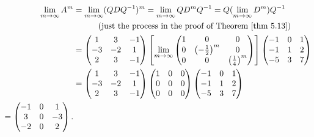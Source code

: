 \begin{align*}
    \lim_{m \toINF} A^m & = \lim_{m \toINF} (Q D Q^{-1})^m = \lim_{m \toINF} Q D^m Q^{-1} = Q (\lim_{m \toINF} D^m) Q^{-1} \\
        & \quad \quad \quad \text{(just the process in the proof of \THM{5.13})} \\
        & = \begin{pmatrix}
                1 & 3 & -1 \\
                -3 & -2 & 1 \\
                2 & 3 & -1
            \end{pmatrix}
            \left[
                \lim_{m \toINF}
                \begin{pmatrix}
                    1 & 0 & 0 \\
                    0 & \left( -\frac{1}{2} \right)^m & 0 \\
                    0 & 0 & \left( \frac{1}{4} \right)^m
                \end{pmatrix}
            \right]
            \begin{pmatrix}
                -1 & 0 & 1 \\
                -1 & 1 & 2 \\
                -5 & 3 & 7
            \end{pmatrix} \\
        & = \begin{pmatrix}
                1 & 3 & -1 \\
                -3 & -2 & 1 \\
                2 & 3 & -1
            \end{pmatrix}
            \begin{pmatrix}
                1 & 0 & 0 \\
                0 & 0 & 0 \\
                0 & 0 & 0
            \end{pmatrix}
            \begin{pmatrix}
                -1 & 0 & 1 \\
                -1 & 1 & 2 \\
                -5 & 3 & 7
            \end{pmatrix} \\
        = \begin{pmatrix}
                -1 & 0 & 1 \\
                3 & 0 & -3 \\
                -2 & 0 & 2
            \end{pmatrix}.
\end{align*}

